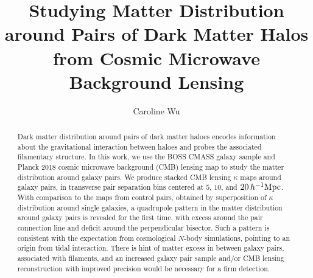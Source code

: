 \documentclass[preprint]{aastex701}
\newcommand{\hinvMpc}{h^{-1}{\rm Mpc}}
\begin{document}
\title{Studying Matter Distribution around Pairs of Dark Matter Halos from Cosmic Microwave Background Lensing}

\author[]{Caroline Wu}

\begin{abstract}
Dark matter distribution around pairs of dark matter haloes encodes information about the gravitational interaction between haloes and probes the associated filamentary structure. In this work, we use the BOSS CMASS galaxy sample and Planck 2018 cosmic microwave background (CMB) lensing map to study the matter distribution around galaxy pairs. We produce stacked CMB lensing $\kappa$ maps around galaxy pairs, in transverse pair separation bins centered
at $5$, $10$, and $20\,\hinvMpc$. With comparison to the maps from control pairs, obtained by superposition of $\kappa$ distribution around single galaxies, a quadrupole pattern in the matter distribution around galaxy pairs is revealed for the first time, with excess around the pair connection line and deficit around the perpendicular bisector. Such a pattern is consistent with the expectation from cosmological $N$-body simulations, pointing to an origin from tidal interaction. There is hint of matter excess in between galaxy pairs, associated with filaments, and an increased galaxy pair sample and/or CMB lensing reconstruction with improved precision would be necessary for a firm detection.

\end{abstract}
\end{document}
